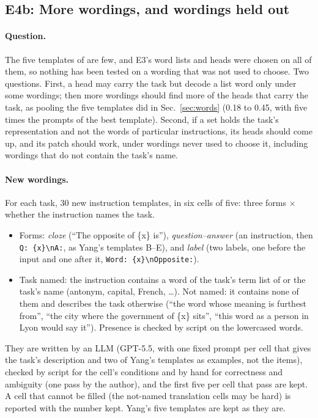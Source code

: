 \documentclass[11pt,a4paper]{article}
\begin{document}
\subsection{E4b: More wordings, and wordings held out}
\label{sec:e4b}

\paragraph{Question.} The five templates of \citet{yang2026shared} are few, and E3's word lists and
heads were chosen on all of them, so nothing has been tested on a wording that was not used
to choose. Two questions. First, a head may carry the task but decode a list word only under
some wordings; then more wordings should find more of the heads that carry the task, as
pooling the five templates did in Sec.~\ref{sec:words} (0.18 to 0.45, with five times the prompts of the
best template). Second, if a set holds the task's
representation and not the words of particular instructions, its heads should come up, and its
patch should work, under wordings never used to choose it, including wordings that do not
contain the task's name.

\paragraph{New wordings.} For each task, 30 new instruction templates, in six cells of five:
three forms $\times$ whether the instruction names the task.
\begin{itemize}
  \item Forms: \emph{cloze} (``The opposite of \{x\} is''), \emph{question--answer} (an
    instruction, then \verb|Q: {x}\nA:|, as Yang's templates B--E), and
    \emph{label} (two labels, one before the input and one after it, \verb|Word: {x}\nOpposite:|).
  \item Task named: the instruction contains a word of the task's term list of \citet{yang2026shared} or
    the task's name (antonym, capital, French, \ldots). Not named: it contains none of them
    and describes the task otherwise (``the word whose meaning is furthest from'', ``the city where
    the government of \{x\} sits'', ``this word as a person in Lyon would say it''). Presence is
    checked by script on the lowercased words.
\end{itemize}
They are written by an LLM (GPT-5.5, with one fixed prompt per cell that gives the task's
description and two of Yang's templates as examples, not the items), checked by script for the
cell's conditions and by hand for correctness and ambiguity (one pass by the author), and the
first five per cell that pass are kept. A cell that cannot be filled (the not-named translation
cells may be hard) is reported with the number kept. Yang's five templates are kept as they are.
\end{document}
